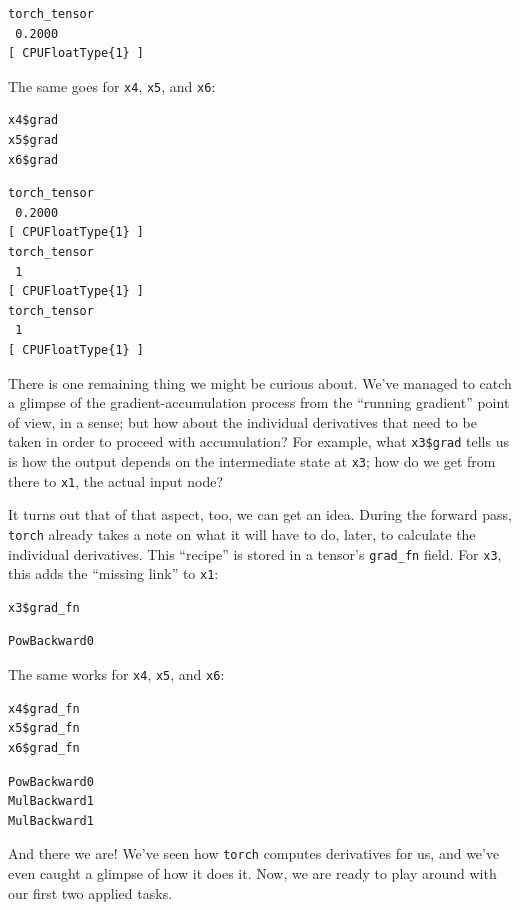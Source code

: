 \documentclass[
  letterpaper,
]{krantz}
\begin{document}
\begin{verbatim}
torch_tensor
 0.2000
[ CPUFloatType{1} ]
\end{verbatim}

The same goes for \texttt{x4}, \texttt{x5}, and \texttt{x6}:

\begin{verbatim}
x4$grad
x5$grad
x6$grad
\end{verbatim}

\begin{verbatim}
torch_tensor
 0.2000
[ CPUFloatType{1} ]
torch_tensor
 1
[ CPUFloatType{1} ]
torch_tensor
 1
[ CPUFloatType{1} ]
\end{verbatim}

There is one remaining thing we might be curious about. We've managed to
catch a glimpse of the gradient-accumulation process from the ``running
gradient'' point of view, in a sense; but how about the individual
derivatives that need to be taken in order to proceed with accumulation?
For example, what \texttt{x3\$grad} tells us is how the output depends
on the intermediate state at \texttt{x3}; how do we get from there to
\texttt{x1}, the actual input node?

It turns out that of that aspect, too, we can get an idea. During the
forward pass, \texttt{torch} already takes a note on what it will have
to do, later, to calculate the individual derivatives. This ``recipe''
is stored in a tensor's \texttt{grad\_fn} field. For \texttt{x3}, this
adds the ``missing link'' to \texttt{x1}:

\begin{verbatim}
x3$grad_fn
\end{verbatim}

\begin{verbatim}
PowBackward0
\end{verbatim}

The same works for \texttt{x4}, \texttt{x5}, and \texttt{x6}:

\begin{verbatim}
x4$grad_fn
x5$grad_fn
x6$grad_fn
\end{verbatim}

\begin{verbatim}
PowBackward0
MulBackward1
MulBackward1
\end{verbatim}

And there we are! We've seen how \texttt{torch} computes derivatives for
us, and we've even caught a glimpse of how it does it. Now, we are ready
to play around with our first two applied tasks.
\end{document}

